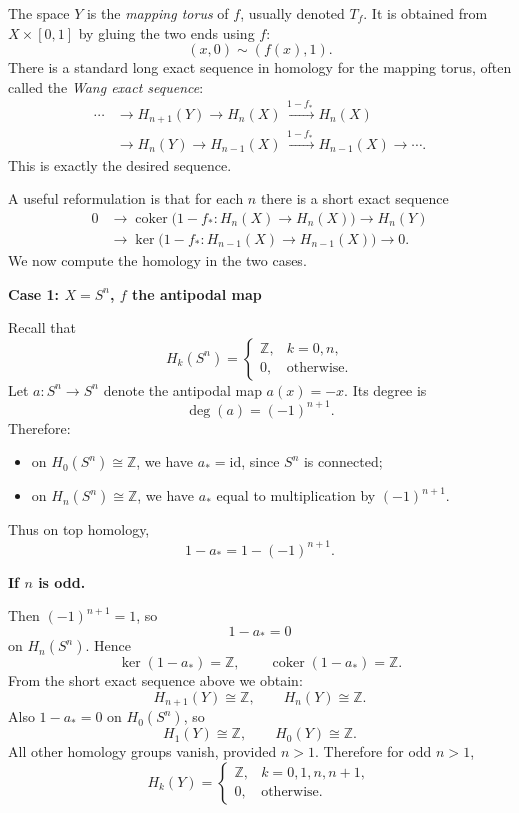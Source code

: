 \begin{solution}
The space \(Y\) is the \emph{mapping torus} of \(f\), usually denoted \(T_f\). It is obtained from \(X\times [0,1]\) by gluing the two ends using \(f\):
\[
(x,0)\sim (f(x),1).
\]
There is a standard long exact sequence in homology for the mapping torus, often called the \emph{Wang exact sequence}:
\[
\begin{aligned}
\cdots&\longrightarrow H_{n+1}(Y)\longrightarrow H_n(X)
\xrightarrow{\,1-f_*\,}H_n(X)\\
&\longrightarrow H_n(Y)\longrightarrow H_{n-1}(X)
\xrightarrow{\,1-f_*\,}H_{n-1}(X)\longrightarrow\cdots .
\end{aligned}
\]
This is exactly the desired sequence.

A useful reformulation is that for each \(n\) there is a short exact sequence
\[
\begin{aligned}
0&\longrightarrow
\operatorname{coker}\!\bigl(1-f_*:H_n(X)\to H_n(X)\bigr)
\longrightarrow H_n(Y)\\
&\longrightarrow
\ker\!\bigl(1-f_*:H_{n-1}(X)\to H_{n-1}(X)\bigr)
\longrightarrow 0.
\end{aligned}
\]
We now compute the homology in the two cases.


\medskip
\noindent\textbf{Case 1: \(X=S^n\), \(f\) the antipodal map}\par
\smallskip


Recall that
\[
H_k(S^n)=
\begin{cases}
	\mathbb Z, & k=0,n,\\
	0, & \text{otherwise}.
\end{cases}
\]
Let \(a:S^n\to S^n\) denote the antipodal map \(a(x)=-x\). Its degree is
\[
\deg(a)=(-1)^{n+1}.
\]
Therefore:
\begin{itemize}
	\item on \(H_0(S^n)\cong \mathbb Z\), we have \(a_*=\mathrm{id}\), since \(S^n\) is connected;
	\item on \(H_n(S^n)\cong \mathbb Z\), we have \(a_*\) equal to multiplication by \((-1)^{n+1}\).
\end{itemize}

Thus on top homology,
\[
1-a_*=1-(-1)^{n+1}.
\]


\medskip
\noindent\textbf{If \(n\) is odd.}\par
\smallskip

Then \((-1)^{n+1}=1\), so
\[
1-a_*=0
\]
on \(H_n(S^n)\). Hence
\[
\ker(1-a_*)=\mathbb Z,\qquad \operatorname{coker}(1-a_*)=\mathbb Z.
\]
From the short exact sequence above we obtain:
\[
H_{n+1}(Y)\cong \mathbb Z,
\qquad
H_n(Y)\cong \mathbb Z.
\]
Also \(1-a_*=0\) on \(H_0(S^n)\), so
\[
H_1(Y)\cong \mathbb Z,
\qquad
H_0(Y)\cong \mathbb Z.
\]
All other homology groups vanish, provided \(n>1\). Therefore for odd \(n>1\),
\[
H_k(Y)=
\begin{cases}
	\mathbb Z, & k=0,1,n,n+1,\\
	0, & \text{otherwise}.
\end{cases}
\]


\end{solution}
